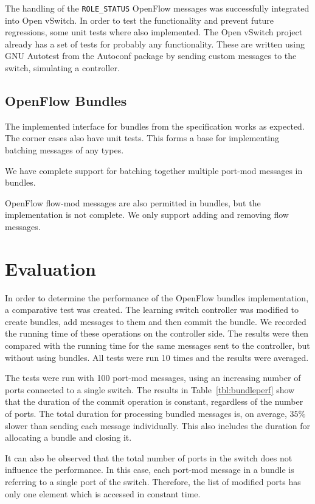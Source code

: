 The handling of the \texttt{ROLE_STATUS} OpenFlow messages was successfully integrated into Open vSwitch.
In order to test the functionality and prevent future regressions, some unit tests
where also implemented. The Open vSwitch project already has a set of tests for probably
any functionality. These are written using GNU Autotest from the Autoconf\cite{autoconf}
package by sending custom messages to the switch, simulating a controller.

\subsection{OpenFlow Bundles}

The implemented interface for bundles from the specification works as expected. The corner cases also
have unit tests. This forms a base for implementing batching messages of any types.

We have complete support for batching together multiple port-mod messages in bundles.

OpenFlow flow-mod messages are also permitted in bundles, but the implementation is not complete.
We only support adding and removing flow messages.


\section{Evaluation}

In order to determine the performance of the OpenFlow bundles implementation, a comparative test
was created. The learning switch controller was modified to create bundles, add messages to them
and then commit the bundle. We recorded the running time of these operations on the controller side.
The results were then compared with the running time for the same messages sent to the controller,
but without using bundles. All tests were run 10 times and the results were averaged.

The tests were run with 100 port-mod messages, using an increasing number of ports connected to a single
switch. The results in Table~\ref{tbl:bundleperf} show that the duration of the commit operation is constant,
regardless of the number of ports. The total duration for processing bundled messages is, on average,
$35\%$ slower than sending each message individually. This also includes the duration for allocating
a bundle and closing it.

It can also be observed that the total number of ports in the switch does not influence the performance.
In this case, each port-mod message in a bundle is referring to a single port of the switch. Therefore, the
list of modified ports has only one element which is accessed in constant time.

